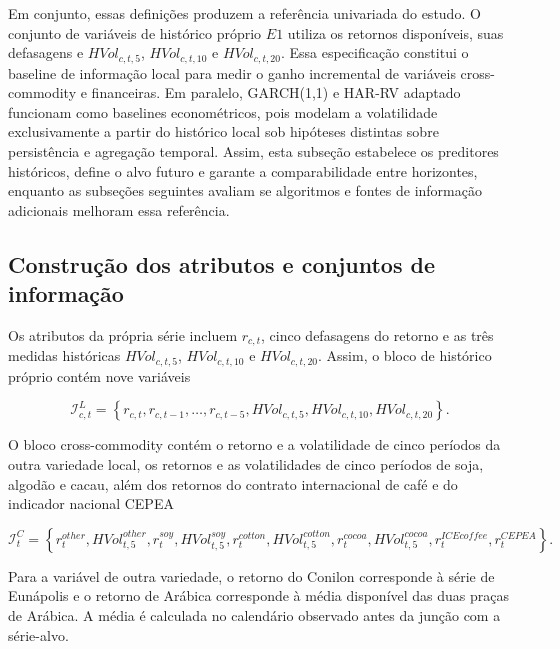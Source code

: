 \documentclass[a4paper,fleqn]{cas-sc}
\begin{document}
Em conjunto, essas definições produzem a referência univariada do estudo. O conjunto de variáveis de histórico próprio \(E1\) utiliza os retornos disponíveis, suas defasagens e \(HVol_{c,t,5}\), \(HVol_{c,t,10}\) e \(HVol_{c,t,20}\). Essa especificação constitui o baseline de informação local para medir o ganho incremental de variáveis cross-commodity e financeiras. Em paralelo, GARCH(1,1) e HAR-RV adaptado funcionam como baselines econométricos, pois modelam a volatilidade exclusivamente a partir do histórico local sob hipóteses distintas sobre persistência e agregação temporal. Assim, esta subseção estabelece os preditores históricos, define o alvo futuro e garante a comparabilidade entre horizontes, enquanto as subseções seguintes avaliam se algoritmos e fontes de informação adicionais melhoram essa referência.

\subsection{Construção dos atributos e conjuntos de informação}
\label{subsec:features}

Os atributos da própria série incluem \(r_{c,t}\), cinco defasagens do retorno e as três medidas históricas \(HVol_{c,t,5}\), \(HVol_{c,t,10}\) e \(HVol_{c,t,20}\). Assim, o bloco de histórico próprio contém nove variáveis

\begin{equation}
\mathcal{I}^{L}_{c,t}
=
\left\{
r_{c,t},r_{c,t-1},\ldots,r_{c,t-5},
HVol_{c,t,5},HVol_{c,t,10},HVol_{c,t,20}
\right\}.
\label{eq:local_info}
\end{equation}

O bloco cross-commodity contém o retorno e a volatilidade de cinco períodos da outra variedade local, os retornos e as volatilidades de cinco períodos de soja, algodão e cacau, além dos retornos do contrato internacional de café e do indicador nacional CEPEA

\begin{equation}
\mathcal{I}^{C}_{t}
=
\left\{
r^{other}_{t},HVol^{other}_{t,5},
r^{soy}_{t},HVol^{soy}_{t,5},
r^{cotton}_{t},HVol^{cotton}_{t,5},
r^{cocoa}_{t},HVol^{cocoa}_{t,5},
r^{ICEcoffee}_{t},r^{CEPEA}_{t}
\right\}.
\label{eq:cross_info}
\end{equation}

Para a variável de outra variedade, o retorno do Conilon corresponde à série de Eunápolis e o retorno de Arábica corresponde à média disponível das duas praças de Arábica. A média é calculada no calendário observado antes da junção com a série-alvo.
\end{document}
